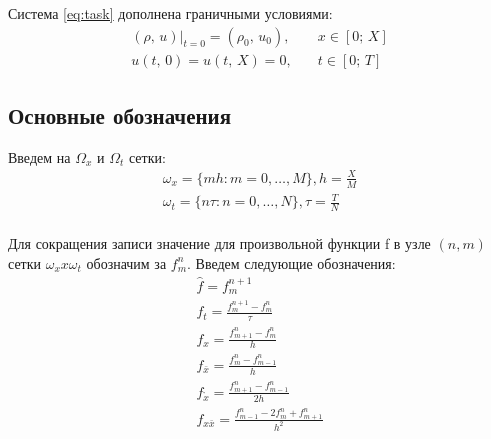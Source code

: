 Система \eqref{eq:task} дополнена граничными условиями:
\begin{equation} \label{eq:terms}
	\begin{array}{lc}
		(\rho, \, u)|_{t = 0} = (\rho_0, \, u_0), &\quad x \in [0; \, X] \\
		u (t, \, 0) = u (t, \, X) = 0, &\quad t \in [0; \, T]
	\end{array}
\end{equation}

\subsection{Основные обозначения}
Введем на $\Omega_x$ и $\Omega_t$ сетки:
\begin{equation}
	\begin{array}{lc}
		\omega_x = \{mh: m = 0, \dots, M\}, h = \frac{X}{M}\\
		\omega_t = \{n\tau: n = 0, \dots, N\}, \tau = \frac{T}{N}\\
	\end{array}
\end{equation}

Для сокращения записи значение для произвольной функции f в узле $(n,m)$ сетки $\omega_x x \omega_t$ обозначим за $f_m^n$. Введем следующие обозначения:
\begin{equation}
	\begin{array}{lc}
		\hat{f} = f_m^{n+1}\\
		f_t = \frac{f_m^{n+1} - f_m^n}{\tau}\\
		f_x = \frac{f_{m+1}^n - f^n_m}{h}\\
		f_{\bar{x}} = \frac{f_m^n - f^n_{m-1}}{h}\\
		f_{\mathring{x}} = \frac{f_{m+1}^n - f^n_{m-1}}{2h}\\
		f_{x\bar{x}} = \frac{f^n_{m-1} - 2f_m^n + f^n_{m+1}}{h^2}\\
	\end{array}
\end{equation}

\newpage